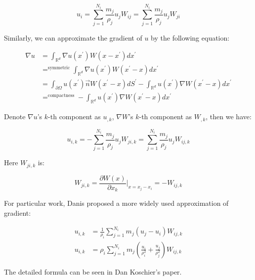 \documentclass[10pt, oneside]{article}
\newcommand{\R}{\mathbb{R}}
\begin{document}
\begin{equation}
    u_i = \sum_{j=1}^{N_i} \frac{m_j}{\rho_j} u_j W_{ij}
    = \sum_{j=1}^{N_i} \frac{m_j}{\rho_j} u_j W_{ji}
\end{equation}

Similarly, 
we can approximate the gradient of $u$ by the following equation:

\begin{equation}
    \begin{aligned}
        \nabla u 
        &= \int_{\R^d} \nabla u(x^\prime) W(x-x^\prime) dx^\prime\\
        &\mathop{=}^{\text{symmetric}} \int_{\R^d} \nabla u(x^\prime) W(x^\prime-x) dx^\prime\\
        &=\int_{\partial \Omega} u(x^\prime) \vec{n} W(x^\prime-x) dS^\prime - 
        \int_{\R^d} u(x^\prime) \nabla W(x^\prime-x) dx^\prime\\
        &\mathop{=}^\text{compactness}-\int_{\R^d} u(x^\prime) \nabla W(x^\prime-x) dx^\prime
    \end{aligned}
\end{equation}

Denote $\nabla u$'s $k$-th component as $u_{,k}$, $\nabla W$'s $k$-th component as $W_{,k}$, 
then we have:

\begin{equation}
    u_{i,k} = -\sum_{j=1}^{N_i} \frac{m_j}{\rho_j} u_j W_{ji,k}
    = \sum_{j=1}^{N_i} \frac{m_j}{\rho_j} u_j W_{ij,k}
\end{equation}

Here $W_{ji,k}$ is:

\begin{equation}
    W_{ji,k} = \frac{\partial W(x)}{\partial x_{k}}|_{x=x_j-x_i}
    =-W_{ij,k}
\end{equation}

For particular work, Danis proposed a more widely used approximation of gradient:

\begin{equation}
    \begin{aligned}
        u_{i,k}&=\frac{1}{\rho_i}\sum_{j=1}^{N_i} m_j (u_j-u_i) W_{ij,k}\\
        u_{i,k}&=\rho_i \sum_{j=1}^{N_i} m_j
        \left(
            \frac{u_i}{\rho_i^2} + \frac{u_j}{\rho_j^2}
        \right) W_{ij,k}
    \end{aligned}
\end{equation}

The detailed formula can be seen in Dan Koschier's paper.
\end{document}
